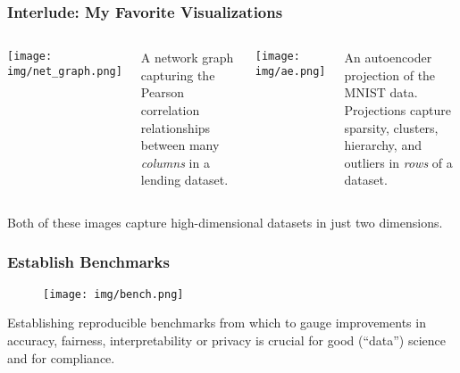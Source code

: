 \documentclass[11pt,
               aspectratio=169,
               hyperref={colorlinks}
               ]{beamer}
\begin{document}
			\begin{frame}

				\frametitle{Interlude: My Favorite Visualizations}		
			
				\vspace{-15pt}
			
				\begin{columns}
	
					\centering
					\texttt{[image: img/net\_graph.png]}
					
					\tiny{A network graph capturing the Pearson correlation relationships between many \textit{columns} in a lending dataset.}
				
					
					\vspace{19pt}
					\centering
					\texttt{[image: img/ae.png]}
					
					\vspace{19pt}
					
					\tiny{An autoencoder projection of the MNIST data. Projections capture sparsity, clusters, hierarchy, and outliers in \textit{rows} of a dataset.}
				
				\end{columns}
			
				\vspace{10pt}
			
				\centering
				\footnotesize{Both of these images capture high-dimensional datasets in just two dimensions.}
		
			\end{frame}
	
			\begin{frame}
			
				\frametitle{Establish Benchmarks}		
	
				\begin{figure}[htb]
					\begin{center}
						\texttt{[image: img/bench.png]}
					\end{center}
				\end{figure}	
	
				\vspace{-10pt}
				\scriptsize{Establishing reproducible benchmarks from which to gauge improvements in accuracy, fairness, interpretability or privacy is crucial for good (``data'') science and for compliance. }
			
			\end{frame}
	
\end{document}
